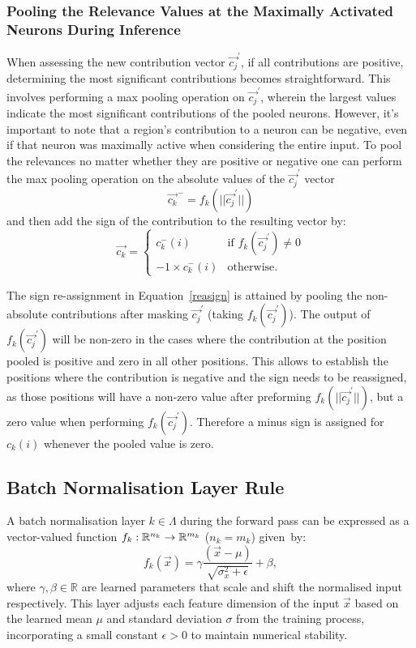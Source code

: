 \subsubsection{Pooling the Relevance Values at the Maximally Activated Neurons During Inference}

When assessing the new contribution vector \(\vec{c_j}^\prime\), if all contributions are positive, determining the most significant contributions becomes straightforward. This involves performing a max pooling operation on \(\vec{c_j}^\prime\), wherein the largest values indicate the most significant contributions of the pooled neurons. However, it's important to note that a region's contribution to a neuron can be negative, even if that neuron was maximally active when considering the entire input. To pool the relevances no matter whether they are positive or negative one can perform the max pooling operation on the absolute values of the $\vec{c_j}^\prime$ vector 
\begin{equation}
    \label{pool}
    \vec{c_{k}}^- = f_{k}(||\vec{c_j}^\prime||)
\end{equation}
and then add the sign of the contribution to the resulting vector by:
\begin{equation}
    \label{reasign}
    \vec{c_{k}} = \begin{cases}
    c_{k}^-(i) & \mbox{if $f_{k}(\vec{c_j}^\prime)\not=0$}\\
    -1\times c_{k}^-(i)& \mbox{otherwise}.
    \end{cases}
\end{equation}

The sign re-assignment in Equation~\ref{reasign} is attained by pooling the non-absolute contributions after masking $\vec{c_j}^\prime$ (\ie taking $f_{k}(\vec{c_j}^\prime)$). The output of $f_{k}(\vec{c_j}^\prime)$ will be non-zero in the cases where the contribution at the position pooled is positive and zero in all other positions. This allows to establish the positions where the contribution is negative and the sign needs to be reassigned, as those positions will have a non-zero value after preforming $f_{k}(||\vec{c_j}^\prime||)$, but a zero value when performing $f_{k}(\vec{c_j}^\prime)$. Therefore a minus sign is assigned for $c_{k}(i)$ whenever the pooled value is zero.


\subsection{Batch Normalisation Layer Rule}
A batch normalisation layer $k\in \Lambda$ during the forward pass can be expressed as a vector-valued function $f_k:\mathbb{R}^{n_k}\to \mathbb{R}^{m_k}$ ($n_k=m_k$) given~by:
\begin{equation*}
    f_k(\vec{x}) = \gamma \frac{(\vec{x}-\mu)}{\sqrt{\sigma_x^2 +\epsilon}} + \beta ,
\end{equation*}
where $\gamma,\beta \in \mathbb{R}$ are learned parameters that scale and shift the normalised input respectively. This layer adjusts each feature dimension of the input \(\vec{x}\) based on the learned mean \(\mu\) and standard deviation \(\sigma\) from the training process, incorporating a small constant \(\epsilon > 0\) to maintain numerical stability.

